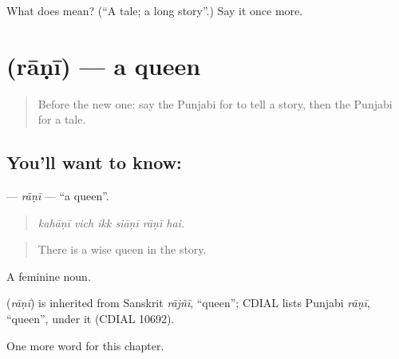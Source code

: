 \begin{tcolorbox}[breakable,colback=teal!4,colframe=teal!35!black,title={Before you move on}]
What does  mean? (\textquotedblleft{}A tale; a long story\textquotedblright{}.) Say it once more.
\end{tcolorbox}
\section[\texorpdfstring{\pa{ਰਾਣੀ} (rāṇī)}{ਰਾਣੀ (rāṇī)}]{ (rāṇī) — a queen}

\label{lesson:PA-C354-rani}



\begin{quote}
Before the new one: say the Punjabi for to tell a story, then the Punjabi for a tale.
\end{quote}

\subsection*{You'll want to know: }
\textbf{} — \emph{rāṇī} — \textquotedblleft{}a queen\textquotedblright{}.

\begin{quote}
     
\end{quote}

\begin{quote}
\emph{kahāṇī vich ikk siāṇī rāṇī hai.}
\end{quote}

\begin{quote}
There is a wise queen in the story.
\end{quote}

A feminine noun.

\begin{cousinweb}
\textbf{} (\emph{rāṇī}) is inherited from Sanskrit \emph{rājñī}, \textquotedblleft{}queen\textquotedblright{}; CDIAL lists Punjabi \emph{rāṇī}, \textquotedblleft{}queen\textquotedblright{}, under it (CDIAL 10692).
\end{cousinweb}

\begin{grammarlens}[title={What you've built}]
One more word for this chapter.
\end{grammarlens}

